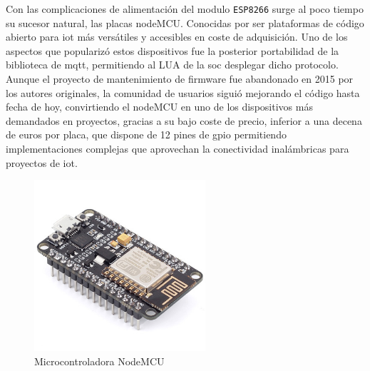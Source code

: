 \vspace{1cm}

Con las complicaciones de alimentación del modulo \verb|ESP8266| surge al poco tiempo su sucesor natural, las placas nodeMCU. Conocidas por ser plataformas de código abierto para \gls{iot} más versátiles y accesibles en coste de adquisición. Uno de los aspectos que popularizó estos dispositivos fue la posterior portabilidad de la biblioteca de \gls{mqtt}, permitiendo al LUA de la \gls{soc} desplegar dicho protocolo. Aunque el proyecto de mantenimiento de firmware fue abandonado en 2015 por los autores originales, la comunidad de usuarios siguió mejorando el código hasta fecha de hoy, convirtiendo el nodeMCU en uno de los dispositivos más demandados en proyectos, gracias a su bajo coste de precio, inferior a una decena de euros por placa, que dispone de 12 pines de \gls{gpio} permitiendo implementaciones complejas que aprovechan la conectividad inalámbricas para proyectos de \gls{iot}.

\begin{figure}[hbt!]
\centering
\includegraphics[height=2.5in]{figures/nodemcu.jpg}
\caption[captura de una nodeMCU]{Microcontroladora NodeMCU\footnotemark}
\end{figure}
